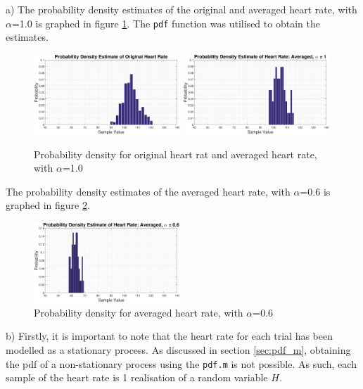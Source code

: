 \documentclass{article}
\begin{document}
a) The probability density estimates of the original and averaged heart rate, with $\alpha$=1.0 is graphed in figure \ref{fig:heart_rate_pde_1}. The {\tt pdf} function was utilised to obtain the estimates.

\begin{figure}[H]
    \centering
    \includegraphics[width = 0.49\textwidth]{pdf_heart_rate_original}
    \includegraphics[width = 0.49\textwidth]{pdf_heart_rate_averaged_alpha_1}
    \caption{Probability density for original heart rat and averaged heart rate, with $\alpha$=1.0}
    \label{fig:heart_rate_pde_1}
\end{figure}

\newpage
The probability density estimates of the averaged heart rate, with $\alpha$=0.6 is graphed in figure \ref{fig:heart_rate_pde_2}.

\begin{figure}[H]
    \centering
    \includegraphics[width = 0.49\textwidth]{pdf_heart_rate_averaged_alpha_point_6}
    \caption{Probability density for averaged heart rate, with $\alpha$=0.6}
    \label{fig:heart_rate_pde_2}
\end{figure}

b) Firstly, it is important to note that the heart rate for each trial has been modelled as a stationary process. As discussed in section \ref{sec:pdf_m}, obtaining the pdf of a non-stationary process using the {\tt pdf.m} is not possible. As such, each sample of the heart rate is 1 realisation of a random variable $H$.\\
\end{document}
